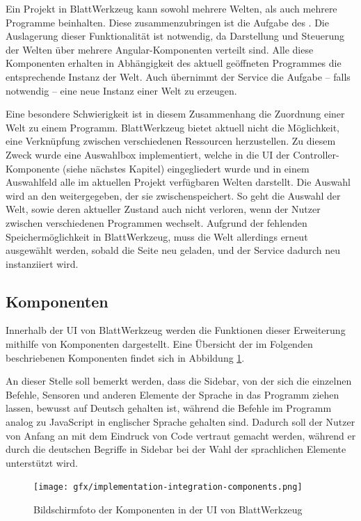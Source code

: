 Ein Projekt in BlattWerkzeug kann sowohl mehrere Welten, als auch mehrere Programme beinhalten. Diese zusammenzubringen ist die Aufgabe des . Die Auslagerung dieser Funktionalität ist notwendig, da Darstellung und Steuerung der Welten über mehrere Angular-Komponenten verteilt sind. Alle diese Komponenten erhalten in Abhängigkeit des aktuell geöffneten Programmes die entsprechende Instanz der Welt. Auch übernimmt der Service die Aufgabe -- falls notwendig -- eine neue Instanz einer Welt zu erzeugen.

Eine besondere Schwierigkeit ist in diesem Zusammenhang die Zuordnung einer Welt zu einem Programm. BlattWerkzeug bietet aktuell nicht die Möglichkeit, eine Verknüpfung zwischen verschiedenen Ressourcen herzustellen. Zu diesem Zweck wurde eine Auswahlbox implementiert, welche in die UI der Controller-Komponente (siehe nächstes Kapitel) eingegliedert wurde und in einem Auswahlfeld alle im aktuellen Projekt verfügbaren Welten darstellt. Die Auswahl wird an den  weitergegeben, der sie zwischenspeichert. So geht die Auswahl der Welt, sowie deren aktueller Zustand auch nicht verloren, wenn der Nutzer zwischen verschiedenen Programmen wechselt. Aufgrund der fehlenden Speichermöglichkeit in BlattWerkzeug, muss die Welt allerdings erneut ausgewählt werden, sobald die Seite neu geladen, und der Service dadurch neu instanziiert wird.

\subsection{Komponenten}
\label{sec:implementation:integration:components}

Innerhalb der UI von BlattWerkzeug werden die Funktionen dieser Erweiterung mithilfe von Komponenten dargestellt. Eine Übersicht der im Folgenden beschriebenen Komponenten findet sich in Abbildung \ref{fig:implementation:integration:components}.

An dieser Stelle soll bemerkt werden, dass die Sidebar, von der sich die einzelnen Befehle, Sensoren und anderen Elemente der Sprache in das Programm ziehen lassen, bewusst auf Deutsch gehalten ist, während die Befehle im Programm analog zu JavaScript in englischer Sprache gehalten sind. Dadurch soll der Nutzer von Anfang an mit dem Eindruck von Code vertraut gemacht werden, während er durch die deutschen Begriffe in Sidebar bei der Wahl der sprachlichen Elemente unterstützt wird.

\begin{figure}
  \centering
  \texttt{[image: gfx/implementation-integration-components.png]}
  \caption{Bildschirmfoto der Komponenten in der UI von BlattWerkzeug}
  \label{fig:implementation:integration:components}
\end{figure}

